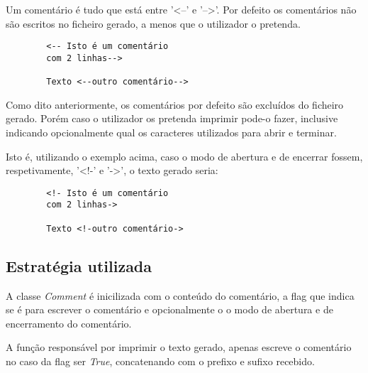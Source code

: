 \documentclass[../relatorio.tex]{subfiles}
\begin{document}
    Um comentário é tudo que está entre '<--' e '-->'. Por defeito
    os comentários não são escritos no ficheiro gerado, a menos que o
    utilizador o pretenda.

    \begin{verbatim}
        <-- Isto é um comentário
        com 2 linhas-->

        Texto <--outro comentário-->
    \end{verbatim}

    Como dito anteriormente, os comentários por defeito são excluídos
    do ficheiro gerado. Porém caso o utilizador os pretenda imprimir
    pode-o fazer, inclusive indicando opcionalmente qual os caracteres
    utilizados para abrir e terminar. 
    
    Isto é, utilizando o exemplo acima, caso o modo de abertura e de 
    encerrar fossem, respetivamente, '<!-' e '->', o texto gerado seria:

    \begin{verbatim}
        <!- Isto é um comentário
        com 2 linhas->

        Texto <!-outro comentário->
    \end{verbatim}


    \subsection*{Estratégia utilizada}

    A classe \textit{Comment} é inicilizada com o conteúdo do comentário,
    a flag que indica se é para escrever o comentário e opcionalmente o 
    o modo de abertura e de encerramento do comentário.

    A função responsável por imprimir o texto gerado, apenas escreve o
    comentário no caso da flag ser \textit{True}, concatenando com o prefixo
    e sufixo recebido.
\end{document}
